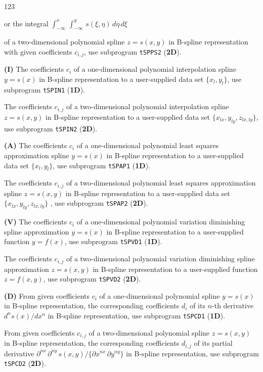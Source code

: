 \begin{DL}{123}
\begin{center}
or the integral \quad $\displaystyle
\int_{-\infty}^x\,\int_{-\infty}^y\,s(\xi,\eta)\,d\eta\,d\xi$
\end{center}
of a two-dimensional polynomial spline $z = s(x,y)$
in B-spline representation with given coefficients $c_{i,j}$, use
subprogram {\tt tSPPS2} ({\bf 2D}).
\item[{\bf (I)}]
The coefficients $c_i$ of a one-dimensional
polynomial interpolation spline $y = s(x)$ in B-spline
representation to a user-supplied data set $\{x_l,y_l\}$, use
subprogram {\tt tSPIN1} ({\bf 1D}).
\par
The coefficients $c_{i,j}$ of a two-dimensional
polynomial interpolation spline $z = s(x,y)$ in B-spline
representation to a user-supplied data set
$\{x_{lx},y_{ly},z_{lx,ly}\}$, use subprogram
{\tt tSPIN2} ({\bf 2D}).
\item[{\bf (A)}]
The coefficients $c_i$ of a one-dimensional
polynomial least squares approximation spline $y=s(x)$ in
B-spline representation to a user-supplied data set $\{x_l,y_l\}$,
use subprogram {\tt tSPAP1} ({\bf 1D}).
\par
The coefficients $c_{i,j}$ of a two-dimensional
polynomial least squares approximation spline $z=s(x,y)$ in
B-spline representation to a user-supplied data set
$\{x_{lx},y_{ly},z_{lx,ly}\}$ ,
use subprogram {\tt tSPAP2} ({\bf 2D}).
\item[{\bf (V)}]
The coefficients $c_i$ of a one-dimensional
polynomial variation diminishing spline approximation $y = s(x)$
in B-spline representation to a user-supplied function $y = f(x)$,
use subprogram {\tt tSPVD1} ({\bf 1D}).
\par
The coefficients $c_{i,j}$ of a two-dimensional
polynomial variation diminishing spline approximation $z = s(x,y)$
in B-spline representation to a user-supplied function
$z = f(x,y)$, use subprogram {\tt tSPVD2} ({\bf 2D}).
\item[{\bf (D)}]
From given coefficients $c_i$ of a
one-dimensional polynomial spline $y = s(x)$ in B-spline
representation, the corresponding coefficients $d_i$ of its $n$-th
derivative $d^n s(x)/dx^n$ in B-spline representation,
use subprogram {\tt tSPCD1} ({\bf 1D}).
\par
From given coefficients $c_{i,j}$ of a
two-dimensional polynomial spline $z = s(x,y)$ in B-spline
representation, the corresponding coefficients $d_{i,j}$ of its
partial derivative
$\partial^{nx}\,\partial^{ny}\,s(x,y)/\{\partial x^{nx}\,
\partial y^{ny} \}$ in B-spline representation,
use subprogram {\tt tSPCD2} ({\bf 2D}).
\end{DL}
